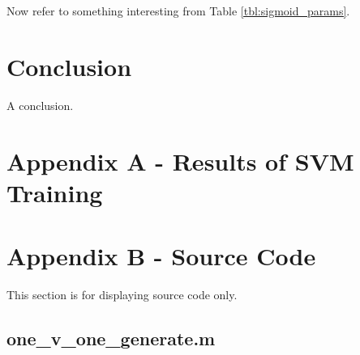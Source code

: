 \documentclass[a4paper, 10pt, conference]{ieeeconf}
\begin{document}
Now refer to something interesting from Table \ref{tbl:sigmoid_params}.

\section{Conclusion}
A conclusion.







\clearpage
\onecolumn
\section{Appendix A - Results of SVM Training}





\section{Appendix B - Source Code}

This section is for displaying source code only.\\
\subsection*{one\_v\_one\_generate.m}

\end{document}
